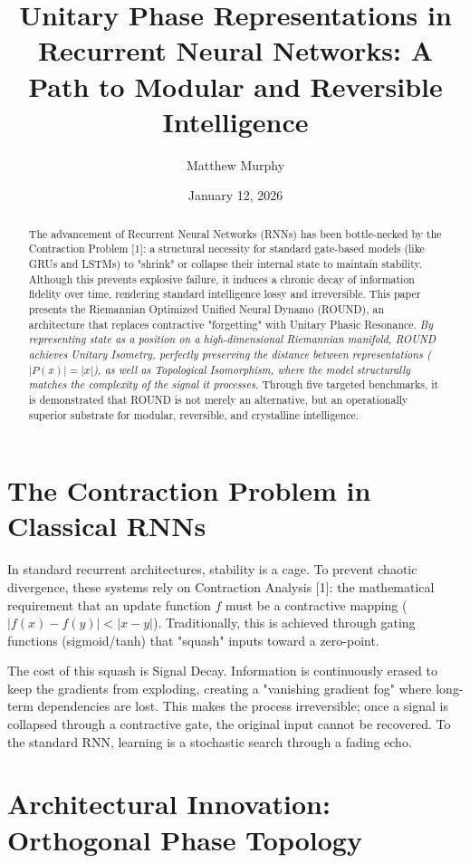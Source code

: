 \documentclass[11pt]{article}
\title{Unitary Phase Representations in Recurrent Neural Networks: A Path to Modular and Reversible Intelligence}
\author{Matthew Murphy}
\date{January 12, 2026}
\begin{document}
\maketitle


\begin{abstract}

The advancement of Recurrent Neural Networks (RNNs) has been bottle-necked by the Contraction Problem [1]: a structural necessity for standard gate-based models (like GRUs and LSTMs) to "shrink" or collapse their internal state to maintain stability. Although this prevents explosive failure, it induces a chronic decay of information fidelity over time, rendering standard intelligence lossy and irreversible. This paper presents the Riemannian Optimized Unified Neural Dynamo (ROUND), an architecture that replaces contractive "forgetting" with Unitary Phasic Resonance. \textit{By representing state as a position on a high-dimensional Riemannian manifold, ROUND achieves }\textit{Unitary Isometry}\textit{, perfectly preserving the distance between representations ($|P(x)| = |x|$), as well as Topological Isomorphism}\textit{, where the model structurally matches the complexity of the signal it processes.}  Through five targeted benchmarks, it is demonstrated that ROUND is not merely an alternative, but an operationally superior substrate for modular, reversible, and crystalline intelligence.
\end{abstract}
\section{The Contraction Problem in Classical RNNs}

In standard recurrent architectures, stability is a cage. To prevent chaotic divergence, these systems rely on Contraction Analysis [1]: the mathematical requirement that an update function $f$ must be a contractive mapping ($|f(x) - f(y)| < |x - y|$). Traditionally, this is achieved through gating functions (sigmoid/tanh) that "squash" inputs toward a zero-point.

The cost of this squash is Signal Decay. Information is continuously erased to keep the gradients from exploding, creating a "vanishing gradient fog" where long-term dependencies are lost. This makes the process irreversible; once a signal is collapsed through a contractive gate, the original input cannot be recovered. To the standard RNN, learning is a stochastic search through a fading echo.

\section{Architectural Innovation: Orthogonal Phase Topology}
\end{document}
